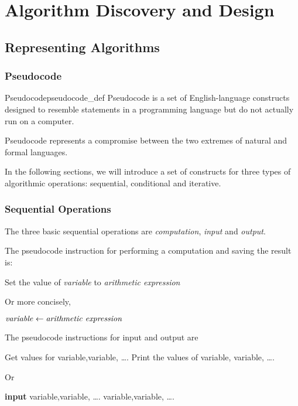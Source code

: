 \chapter{Algorithm Discovery and Design}

\section{Representing Algorithms}

\subsection{Pseudocode}

\begin{mydef}{Pseudocode}{pseudocode_def}
Pseudocode is a set of English-language constructs designed to resemble statements in a programming language but do not actually run on a computer.
\end{mydef}

\begin{remark}
Pseudocode represents a compromise between the two extremes of natural and formal languages.
\end{remark}

In the following sections, we will introduce a set of constructs for three types of algorithmic operations: sequential, conditional and iterative.

\subsection{Sequential Operations}

The three basic sequential operations are \emph{computation}, \emph{input} and \emph{output}.

The pseudocode instruction for performing a computation and saving the result is:

\begin{algorithmic}
	\State Set the value of \emph{variable} to \emph{arithmetic expression}
\end{algorithmic}
Or more concisely,
\begin{algorithmic}
	\State $\text{\emph{variable}} \gets \text{\emph{arithmetic expression}}$
\end{algorithmic}

The pseudocode instructions for input and output are
\begin{algorithmic}
	\State Get values for variable,variable, \ldots.
	\State Print the values of variable, variable, \ldots.
	
\end{algorithmic}
Or
\begin{algorithmic}
	\State \textbf{input} variable,variable, \ldots.
	\State \Output variable,variable, \ldots.
\end{algorithmic}

